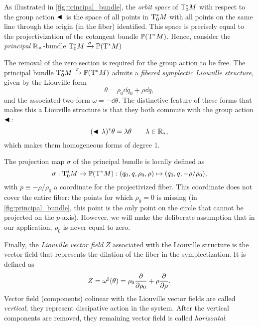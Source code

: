 As illustrated in \cref{fig:principal_bundle}, the \emph{orbit space} of $\mathrm{T}^*_0M$ with respect to the group action $\blacktriangleleft\,$ is the space of all points in $\mathrm{T}^*_0M$ with all points on the same line through the origin (in the fiber) identified. This space is precisely equal to the projectivization of the cotangent bundle $\mathbb{P}\qty(\mathrm{T}^*M)$. Hence, consider the \emph{principal} $\mathbb{R}_{\times}$-bundle $\mathrm{T}^*_0M\xrightarrow[]{\sigma}\mathbb{P}\qty(\mathrm{T}^*M)$ 
\begin{center}
\end{center}
The removal of the zero section is required for the group action to be free. The principal bundle $\mathrm{T}^*_0M\xrightarrow[]{\pi}\mathbb{P}\qty(\mathrm{T}^*M)$ admits a \emph{fibered symplectic Liouville structure}, given by the Liouville form \cite{Libermann1987}
$$ \theta = \rho_0\dd{q_0} + \rho\dd{q}, $$
and the associated two-form $\omega = -\dd{\theta}$. The distinctive feature of these forms that makes this a Liouville structure is that they both commute with the group action $\blacktriangleleft\,$: \cite{Libermann1987}
$$ (\blacktriangleleft\,\lambda)^* \theta = \lambda \theta \qquad \lambda \in \mathbb{R}_*,$$
which makes them homogeneous forms of degree 1.

The projection map $\sigma$ of the principal bundle is locally defined as 
\begin{equation}
    \sigma : \mathrm{T}^*_0M \to \mathbb{P}\qty(\mathrm{T}^*M): (q_0, q, \rho_0, \rho) \mapsto (q_0, q, -\rho/\rho_0), 
    \label{eq:principal_projection}
\end{equation}
with $p \equiv -\rho/\rho_0$ a coordinate for the projectivized fiber. This coordinate does not cover the entire fiber: the points for which $\rho_0 = 0$ is missing (in \cref{fig:principal_bundle}, this point is the only point on the circle that cannot be projected on the $p$-axis). However, we will make the deliberate assumption that in our application, $\rho_0$ is never equal to zero.

Finally, the \emph{Liouville vector field} $Z$ associated with the Liouville structure is the vector field that represents the dilation of the fiber in the symplectization. It is defined as
\begin{equation}
    Z = \omega^\sharp(\theta) = \rho_0\pdv{}{\rho_0} + \rho\pdv{}{\rho}. 
    \label{eq:liouville_vf}
\end{equation}
Vector field (components) colinear with the Liouville vector fields are called \emph{vertical}; they represent dissipative action in the system. After the vertical components are removed, they remaining vector field is called \emph{horizontal}.

